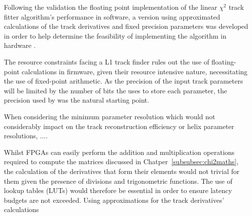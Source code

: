 %

Following the validation the floating point implementation of the linear $\chi^{2}$ track fitter algorithm's performance in software, a version using approximated calculations of the track derivatives and fixed precision parameters was developed in order to help determine the feasibility of implementing the algorithm in hardware .

The resource constraints facing a L1 track finder rules out the use of floating-point calculations in firmware, given their resource intensive nature, necessitating the use of fixed-point arithmetic.
As the precision of the input track parameters will be limited by the number of bits the \HT uses to store each parameter, the precision used by was the natural starting point.

When considering the minimum parameter resolution which would not considerably impact on the track reconstruction efficiency or helix parameter resolutions, .... 



Whilst FPGAs can easily perform the addition and multiplication operations required to compute the matrices discussed in Chatper~\ref{subsubsec:chi2maths}, the calculation of the derivatives that form their elements would not trivial for them given the presence of divisions and trigonometric functions.
The use of lookup tables (LUTs) would therefore be essential in order to ensure latency budgets are not exceeded.
Using approximations for the track derivatives' calculations 

